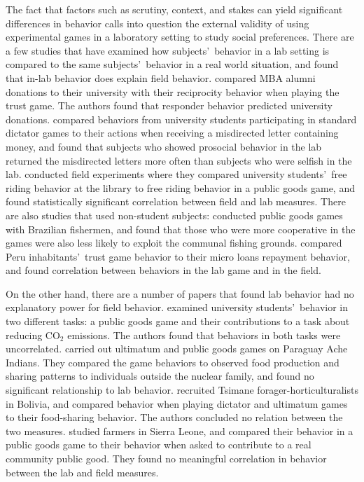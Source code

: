 \documentclass[12pt]{article}
\begin{document}
The fact that factors such as scrutiny, context, and stakes can yield significant differences in behavior calls into question the external validity of using experimental games in a laboratory setting to study social preferences. There are a few studies that have examined how subjects\rq \ behavior in a lab setting is compared to the same subjects\rq  \ behavior in a real world situation, and found that in-lab behavior does explain field behavior. \cite{baran_2010} compared MBA alumni donations to their university with their reciprocity behavior when playing the trust game. The authors found that responder behavior predicted university donations. \cite{franzen_pointner_2012} compared behaviors from university students participating in standard dictator games to their actions when receiving a misdirected letter containing money, and found that subjects who showed prosocial behavior in the lab returned the misdirected letters more often than subjects who were selfish in the lab. \cite{englmaier_gebhardt_2011} conducted field experiments where they compared university students\rq \ free riding behavior at the library to free riding behavior in a public goods game, and found statistically significant correlation between field and lab measures. There are also studies that used non-student subjects: \cite{fehr_leibbrandt_2011} conducted public goods games with Brazilian fishermen, and found that those who were more cooperative in the games were also less likely to exploit the communal fishing grounds. \cite{karlan_2005} compared Peru inhabitants\rq \ trust game behavior to their micro loans repayment behavior, and found correlation between behaviors in the lab game and in the field. 

On the other hand, there are a number of papers that found lab behavior had no explanatory power for field behavior. \cite{goeschl_2015} examined university students\rq \ behavior in two different tasks: a public goods game and their contributions to a task about reducing CO$_{2}$ emissions. The authors found that behaviors in both tasks were uncorrelated. \cite{hill_gurven_2004} carried out ultimatum and public goods games on Paraguay Ache Indians. They compared the game behaviors to observed food production and sharing patterns to individuals outside the nuclear family, and found no significant relationship to lab behavior. \cite{gurven_winking_2008} recruited Tsimane forager-horticulturalists in Bolivia, and compared behavior when playing dictator and ultimatum games to their food-sharing behavior. The authors concluded no relation between the two measures. \cite{voors_2012} studied farmers in Sierra Leone, and compared their behavior in a public goods game to their behavior when asked to contribute to a real community public good. They found no meaningful correlation in behavior between the lab and field measures. 
\end{document}
